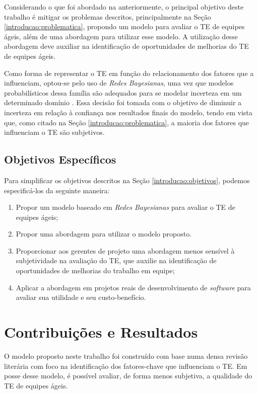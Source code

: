 Considerando o que foi abordado na anteriormente, o principal objetivo deste trabalho é mitigar os problemas descritos, principalmente na Seção \ref{introducao:problematica}, propondo um modelo para avaliar o TE de equipes ágeis, além de uma abordagem para utilizar esse modelo. A utilização desse abordagem deve auxiliar na identificação de oportunidades de melhorias do TE de equipes ágeis.

Como forma de representar o TE em função do relacionamento dos fatores que a influenciam, optou-se pelo uso de \textit{Redes Bayesianas}, uma vez que modelos probabilísticos dessa família são adequados para se modelar incerteza em um determinado domínio \cite{bengal}. Essa decisão foi tomada com o objetivo de diminuir a incerteza em relação à confiança nos resultados finais do modelo, tendo em vista que, como citado na Seção \ref{introducao:problematica}, a maioria dos fatores que influenciam o TE são subjetivos.

\subsection{Objetivos Específicos}
\label{introducao:objetivos:especificos}

Para simplificar os objetivos descritos na Seção \ref{introducao:objetivos}, podemos especificá-los da seguinte maneira:

\begin{enumerate}
  \item Propor um modelo baseado em \textit{Redes Bayesianas} para avaliar o TE de equipes ágeis;
  \item Propor uma abordagem para utilizar o modelo proposto.
  \item Proporcionar aos gerentes de projeto uma abordagem menos sensível à subjetividade na avaliação do TE, que auxilie na identificação de oportunidades de melhorias do trabalho em equipe;
  \item Aplicar a abordagem em projetos reais de desenvolvimento de \textit{software} para avaliar sua utilidade e seu custo-benefício.
\end{enumerate}

\section{Contribuições e Resultados}
\label{introducao:resultados}

O modelo proposto neste trabalho foi construído com base numa densa revisão literária com foco na identificação dos fatores-chave que influenciam o TE. Em posse desse modelo, é possível avaliar, de forma menos subjetiva, a qualidade do TE de equipes ágeis.

